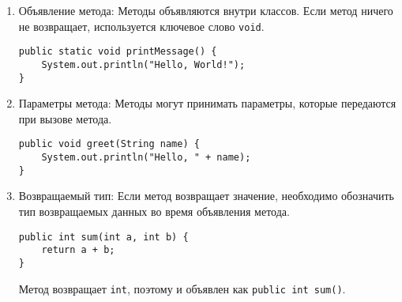 \begin{enumerate}
    \item Объявление метода: Методы объявляются внутри классов.
    Если метод ничего не возвращает, используется ключевое слово \texttt{void}.

    \begin{verbatim}
public static void printMessage() {
    System.out.println("Hello, World!");
}
    \end{verbatim}
    \vspace{0.4cm}


    \item Параметры метода: Методы могут принимать параметры, которые передаются при вызове метода.
    
    \begin{verbatim}
public void greet(String name) {
    System.out.println("Hello, " + name);
}
    \end{verbatim}
    \vspace{0.4cm}


    \item Возвращаемый тип: Если метод возвращает значение, необходимо обозначить тип возвращаемых данных во время объявления метода. 

    \begin{verbatim}
public int sum(int a, int b) {
    return a + b;
}
    \end{verbatim}

    Метод возвращает \texttt{int}, поэтому и объявлен как \texttt{public int sum()}.    
\end{enumerate}